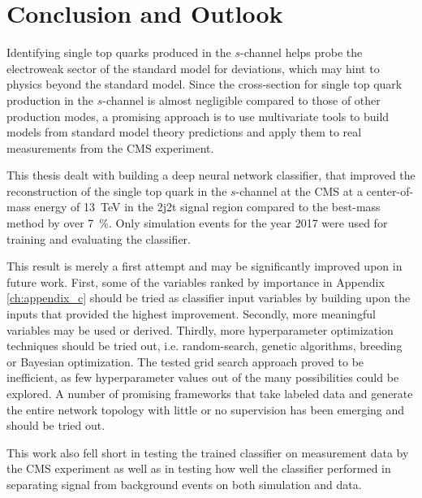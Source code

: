 \chapter{Conclusion and Outlook}
Identifying single top quarks produced in the $s$-channel helps probe the electroweak sector of the standard model for deviations, which may hint to physics beyond the standard model. Since the cross-section for single top quark production in the $s$-channel is almost negligible compared to those of other production modes, a promising approach is to use multivariate tools to build models from standard model theory predictions and apply them to real measurements from the CMS experiment.

This thesis dealt with building a deep neural network classifier, that improved the reconstruction of the single top quark in the $s$-channel at the CMS at a center-of-mass energy of \SI{13}{TeV} in the 2j2t signal region compared to the best-mass method by over \SI{7}{\%}. Only simulation events for the year 2017 were used for training and evaluating the classifier.

This result is merely a first attempt and may be significantly improved upon in future work. First, some of the variables ranked by importance in Appendix \ref{ch:appendix_c} should be tried as classifier input variables by building upon the inputs that provided the highest improvement. Secondly, more meaningful variables may be used or derived. Thirdly, more hyperparameter optimization techniques should be tried out, i.e. random-search, genetic algorithms, breeding or Bayesian optimization. The tested grid search approach proved to be inefficient, as few hyperparameter values out of the many possibilities could be explored. A number of promising frameworks that take labeled data and generate the entire network topology with little or no supervision has been emerging and should be tried out.

This work also fell short in testing the trained classifier on measurement data by the CMS experiment as well as in testing how well the classifier performed in separating signal from background events on both simulation and data.